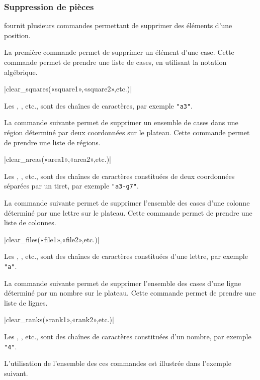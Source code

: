 \documentclass[french]{ltxdoc}
\begin{document}
\subsubsection{Suppression de pièces}

\mpchess fournit plusieurs commandes permettant de supprimer des éléments d’une position.

La première commande permet de supprimer un élément d’une case. Cette commande permet de prendre une liste de cases, en utilisant la notation algébrique.

\commande|clear_squares(«square1»,«square2»,etc.)|\smallskip

Les \textbf{}, \textbf{}, etc., sont des chaînes de caractères, par exemple \lstinline+"a3"+.
\medskip

La commande suivante permet de supprimer un ensemble de cases dans une région
déterminé par deux coordonnées sur le plateau. Cette commande permet de prendre
une liste de régions.

\commande|clear_areas(«area1»,«area2»,etc.)|\smallskip

Les \textbf{}, \textbf{}, etc., sont des chaînes de caractères constituées de deux coordonnées séparées par un tiret, par exemple \lstinline+"a3-g7"+.
\medskip

La commande suivante permet de supprimer l’ensemble des cases d’une colonne
déterminé par une lettre sur le plateau. Cette commande permet de prendre
une liste de colonnes.

\commande|clear_files(«file1»,«file2»,etc.)|\smallskip

Les \textbf{}, \textbf{}, etc., sont des chaînes de caractères constituées d’une lettre, par exemple \lstinline+"a"+.
\medskip

La commande suivante permet de supprimer l’ensemble des cases d’une ligne
déterminé par un nombre sur le plateau. Cette commande permet de prendre
une liste de lignes.

\commande|clear_ranks(«rank1»,«rank2»,etc.)|\smallskip

Les \textbf{}, \textbf{}, etc., sont des chaînes de caractères constituées d’un nombre, par exemple \lstinline+"4"+.

L’utilisation de l’ensemble des ces commandes est illustrée dans l’exemple suivant.
\end{document}
